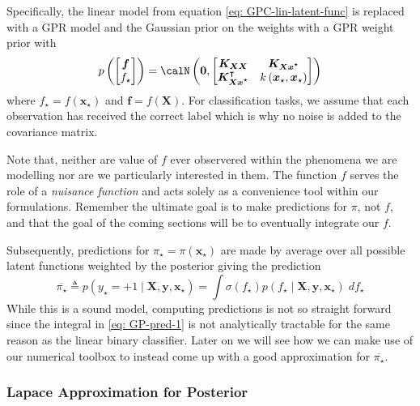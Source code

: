Specifically, the linear model from equation \ref{eq: GPC-lin-latent-func} is replaced with a GPR model and the Gaussian prior on the weights with a GPR weight prior with
\begin{equation*}
    p \left(
    \begin{bmatrix}
            \bm{f} \\
            f_{\star}
        \end{bmatrix}
    \right)
    =
    \calN \left( \bm{0} ,
    \begin{bmatrix}
        \bm{K_{XX}}                     & \bm{K_{Xx^{\star}}}                             \\
        \bm{K_{Xx^{\star}}}^{\intercal} & k \left( \bm{x}_{\star}, \bm{x}_{\star} \right)
    \end{bmatrix}
    \right)
\end{equation*}
where $f_{\star} = f ( \bm{x}_{\star} )$ and $\bm{f} = f \left( \bm{X} \right)$. For classification tasks, we assume that each observation has received the correct label which is why no noise is added to the covariance matrix.

Note that, neither are value of $f$ ever observered within the phenomena we are modelling nor are we particularly interested in them. The function $f$ serves the role of a {\it nuisance function} and acts solely as a convenience tool within our formulations. Remember the ultimate goal is to make predictions for $\pi$, not $f$, and that the goal of the coming sections will be to eventually integrate our $f$.

Subsequently, predictions for $\pi_{\star} = \pi \left( \bm{x}_{\star} \right)$ are made by average over all possible latent functions weighted by the posterior giving the prediction
\begin{equation} \label{eq: GP-pred-1}
    \overline{\pi_{\star}} \triangleq p \left( y_{\star} = +1 \mid \bm{X} , \bm{y} , \bm{x}_{\star} \right) = \int \sigma \left( f_{\star} \right) p \left( f_{\star} \mid \bm{X} , \bm{y} , \bm{x}_{\star} \right) \; d f_{\star}
\end{equation}
While this is a sound model, computing predictions is not so straight forward since the integral in \ref{eq: GP-pred-1} is not analytically tractable for the same reason as the linear binary classifier. Later on we will see how we can make use of our numerical toolbox to instead come up with a good approximation for $\overline{\pi_{\star}}$.

\subsubsection{Lapace Approximation for Posterior}\label{Section1.6.2}

